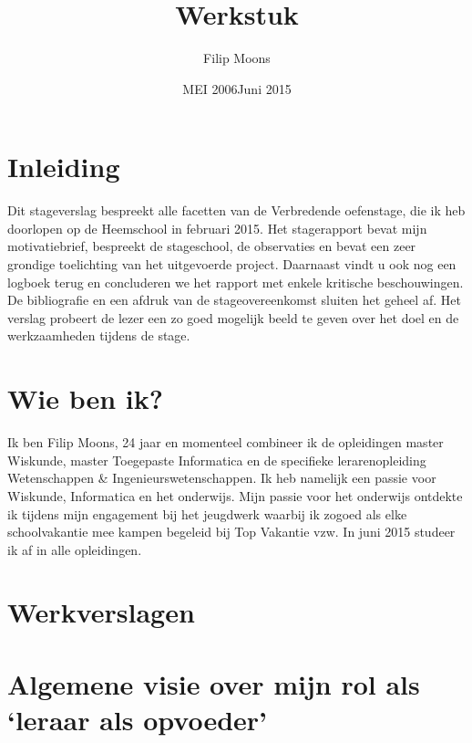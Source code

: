 \documentclass[a4paper,11pt]{article}
\author{Filip Moons}
\title{Werkstuk}
\date{MEI 2006}
\date{Juni 2015}
\theoremstyle{definition}
\begin{document}
\maketitlepage


\tableofcontents
\newpage
\section{Inleiding}
Dit stageverslag bespreekt alle facetten van de Verbredende oefenstage, die ik heb doorlopen op de Heemschool in februari 2015. 
Het stagerapport bevat mijn motivatiebrief, bespreekt de stageschool, de observaties en bevat een zeer grondige toelichting van het uitgevoerde project. 
Daarnaast vindt u ook nog een logboek terug en concluderen we het rapport met enkele kritische beschouwingen. De bibliografie en een afdruk
van de stageovereenkomst sluiten het geheel af. Het verslag 
probeert de lezer een zo goed mogelijk beeld te geven over het doel en de 
werkzaamheden tijdens de stage.
\newpage
\section{Wie ben ik?}
Ik ben Filip Moons, 24 jaar en momenteel combineer ik de opleidingen master Wiskunde, master Toegepaste Informatica
en de specifieke lerarenopleiding Wetenschappen \& Ingenieurswetenschappen. Ik heb namelijk een passie voor
Wiskunde, Informatica en het onderwijs. Mijn passie voor het onderwijs ontdekte ik tijdens mijn engagement bij het jeugdwerk waarbij ik zogoed als
elke schoolvakantie mee  kampen begeleid bij Top Vakantie vzw. In juni 2015 studeer ik af in alle opleidingen. 

\section{Werkverslagen}

\section{Algemene visie over mijn rol als `leraar als opvoeder'}
 
\end{document}
